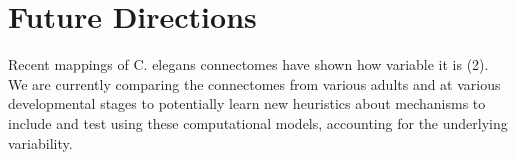 \section{Future Directions}

Recent mappings of C. elegans connectomes have shown how variable it is (2). We are currently comparing the connectomes from various adults and at various developmental stages to potentially learn new heuristics about mechanisms to include and test using these computational models, accounting for the underlying variability. 

